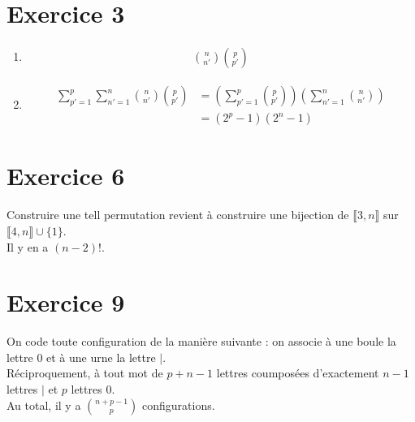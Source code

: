 \documentclass[../main.tex]{subfiles}
\begin{document}
\section*{Exercice 3}
\begin{enumerate}
    \item \begin{align*}
        \binom{n}{n'} \binom{p}{p'}
    \end{align*}
    \item \begin{align*}
        \sum_{p'=1}^{p} \sum_{n'=1}^{n} \binom{n}{n'} \binom{p}{p'} &= \left( \sum_{p'=1}^{p} \binom{p}{p'} \right) \left( \sum_{n'=1}^{n} \binom{n}{n'} \right) \\
        &= (2^p-1)(2^n-1)
    \end{align*}
\end{enumerate}

\section*{Exercice 6}
\noindent Construire une tell permutation revient à construire une bijection de $\llbracket 3, n \rrbracket$ sur $\llbracket 4, n \rrbracket \cup \{1\}$. \\
Il y en a $(n-2)!$. 

\section*{Exercice 9}
\noindent On code toute configuration de la manière suivante : on associe à une boule la lettre $0$ et à une urne la lettre $|$. \\
Réciproquement, à tout mot de $p+n-1$ lettres coumposées d'exactement $n-1$ lettres $|$ et $p$ lettres $0$. \\
Au total, il y a $\binom{n+p-1}{p}$ configurations. 
\end{document}
